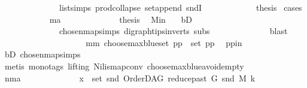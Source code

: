 \begin{isabellebody}
\ \ \ \ \ \ \ \ \ \ \ \ \ \ list{\isachardot}{\kern0pt}simps{\isacharparenleft}{\kern0pt}{}{}{\isacharparenright}{\kern0pt}\ prod{\isachardot}{\kern0pt}collapse\ set{\isacharunderscore}{\kern0pt}append\ sndI{\isacharparenright}{\kern0pt}\ \isanewline
\ \ \ \ \ \ \ \ \isamarkupfalse%
\ \isamarkupfalse%
\ {\isacharquery}{\kern0pt}thesis\ \isamarkupfalse%
{\isacharparenleft}{\kern0pt}cases{\isacharparenright}{\kern0pt}\isanewline
\ \ \ \ \ \ \ \ \ \ \isamarkupfalse%
\ ma\isanewline
\ \ \ \ \ \ \ \ \ \ \isamarkupfalse%
\ \isamarkupfalse%
\ {\isacharquery}{\kern0pt}thesis\ \isamarkupfalse%
\ M{\isacharunderscore}{\kern0pt}in\ \ \isamarkupfalse%
\ bD\ \isanewline
\ \ \ \ \ \ \ \ \ \ \ \ \ \ chosen{\isacharunderscore}{\kern0pt}map{\isacharunderscore}{\kern0pt}simps{\isacharparenleft}{\kern0pt}{}{\isacharparenright}{\kern0pt}\ digraph{\isachardot}{\kern0pt}tips{\isacharunderscore}{\kern0pt}in{\isacharunderscore}{\kern0pt}verts\ subs\isanewline
\ \ \ \ \ \ \ \ \ \ \ \ \isamarkupfalse%
\ blast\ \isanewline
\ \ \ \ \ \ \ \ \isamarkupfalse%
\isanewline
\ \ \ \ \ \ \ \ \ \ \isamarkupfalse%
\ mm{\isacharcolon}{\kern0pt}\ {\isachardoublequoteopen}choose{\isacharunderscore}{\kern0pt}max{\isacharunderscore}{\kern0pt}blue{\isacharunderscore}{\kern0pt}set\ pp\ {\isasymin}\ set\ pp{\isachardoublequoteclose}\ \isamarkupfalse%
\ pp{\isacharunderscore}{\kern0pt}in\ \isamarkupfalse%
\ bD\ chosen{\isacharunderscore}{\kern0pt}map{\isacharunderscore}{\kern0pt}simps{\isacharparenleft}{\kern0pt}{}{\isacharparenright}{\kern0pt}\isanewline
\ \ \ \ \ \ \ \ \ \ \ \ \isamarkupfalse%
\ {\isacharparenleft}{\kern0pt}metis\ {\isacharparenleft}{\kern0pt}mono{\isacharunderscore}{\kern0pt}tags{\isacharcomma}{\kern0pt}\ lifting{\isacharparenright}{\kern0pt}\ Nil{\isacharunderscore}{\kern0pt}is{\isacharunderscore}{\kern0pt}map{\isacharunderscore}{\kern0pt}conv\ choose{\isacharunderscore}{\kern0pt}max{\isacharunderscore}{\kern0pt}blue{\isacharunderscore}{\kern0pt}avoid{\isacharunderscore}{\kern0pt}empty{\isacharparenright}{\kern0pt}\ \ \ \isanewline
\ \ \ \ \ \ \ \ \ \ \isamarkupfalse%
\ nma\isanewline
\ \ \ \ \ \ \ \ \ \ \isamarkupfalse%
\ \isamarkupfalse%
\ {\isachardoublequoteopen}x\ {\isasymin}\ set\ {\isacharparenleft}{\kern0pt}snd\ {\isacharparenleft}{\kern0pt}OrderDAG\ {\isacharparenleft}{\kern0pt}reduce{\isacharunderscore}{\kern0pt}past\ G\ {\isacharparenleft}{\kern0pt}snd\ M{\isacharparenright}{\kern0pt}{\isacharparenright}{\kern0pt}\ k{\isacharparenright}{\kern0pt}{\isacharparenright}{\kern0pt}{\isachardoublequoteclose}\ \isanewline

\end{isabellebody}
